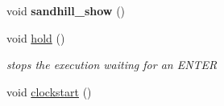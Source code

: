 \begin{DoxyCompactItemize}
\item 
\hypertarget{classtoolbox_a29b20e4b3351d1c98a4131cac99778f9}{void {\bfseries sandhill\+\_\+show} ()}\label{classtoolbox_a29b20e4b3351d1c98a4131cac99778f9}

\item 
\hypertarget{classtoolbox_ab63881e5e61501fa7f84414f6612ee05}{void \hyperlink{classtoolbox_ab63881e5e61501fa7f84414f6612ee05}{hold} ()}\label{classtoolbox_ab63881e5e61501fa7f84414f6612ee05}

\begin{DoxyCompactList}\small\item\em stops the execution waiting for an E\+N\+T\+E\+R \end{DoxyCompactList}\item 
\hypertarget{classtoolbox_a0ee32c4d293b8952a4767e2565a0dc38}{void \hyperlink{classtoolbox_a0ee32c4d293b8952a4767e2565a0dc38}{clockstart} ()}\label{classtoolbox_a0ee32c4d293b8952a4767e2565a0dc38}


\end{DoxyCompactItemize}
